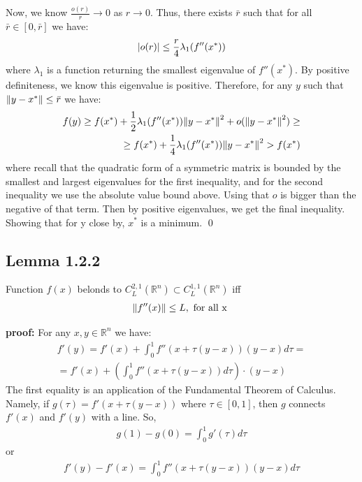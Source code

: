 \documentclass[12pt,a4paper]{article}
\begin{document}
	Now, we know $\frac{o(r)}{r} \rightarrow 0$ as $r \rightarrow 0$. Thus, there exists $\bar{r}$ such that for all $\bar{r} \in [0,\bar{r}]$ we have:
	\begin{align*}
		\abs{o(r)} \leq \frac{r}{4}\lambda_1(f''(x^*))
	\end{align*}
	where $\lambda_1$ is a function returning the smallest eigenvalue of $f''(x^*)$. By positive definiteness, we know this eigenvalue is positive. Therefore, for any $y$ such that $\norm{y-x^*} \leq \bar{r}$ we have:
	\begin{align*}
		f(y) \geq f(x^*) + \frac{1}{2} \lambda_1(f''(x^*)) \norm{y-x^*}^2 + o(\norm{y-x^*}^2) \geq \\
		\geq f(x^*) + \frac{1}{4}\lambda_1(f''(x^*))\norm{y-x^*}^2 > f(x^*)
	\end{align*}
	where recall that the quadratic form of a symmetric matrix is bounded by the smallest and largest eigenvalues for the first inequality, and for the second inequality we use the absolute value bound above. Using that $o$ is bigger than the negative of that term. Then by positive eigenvalues, we get the final inequality. Showing that for y close by, $x^*$ is a minimum. \qed 
	
	
	\subsection*{Lemma 1.2.2}\label{lem122}
	Function $f(x)$ belonds to $C_L^{2,1}(\mathbb{R}^n) \subset C_L^{1,1}(\mathbb{R}^n)$ iff
	\begin{align*}
		\norm{f''(x)} \leq L, \text{  for all x }
	\end{align*}
	
	\textbf{proof:} For any $x,y \in \mathbb{R}^n$ we have:
	\begin{align*}
		f'(y) = f'(x) + \int_{0}^{1}f''(x + \tau(y-x))(y-x)d\tau = \\
		= f'(x) + (\int_{0}^{1}f''(x + \tau(y-x))d\tau)\cdot (y-x)
	\end{align*}
	The first equality is an application of the Fundamental Theorem of Calculus. Namely, if $g(\tau) = f'(x + \tau(y-x))$ where $\tau \in [0,1]$, then $g$ connects $f'(x)$ and $f'(y)$ with a line. So, 
	\begin{align*}
		g(1) - g(0) = \int_{0}^{1} g'(\tau)d\tau
	\end{align*}
	or 
	\begin{align*}
		f'(y) - f'(x) = \int_{0}^{1}f''(x + \tau(y-x))(y-x)d\tau
	\end{align*}
	
\end{document}
